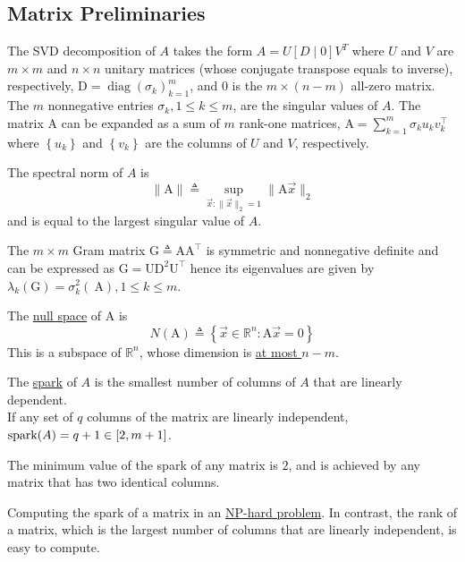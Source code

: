 \documentclass[11pt]{elegantbook}
\begin{document}
\subsection{Matrix Preliminaries}
The SVD decomposition of $A$ takes the form $A=U[D \mid 0] V^T$ where $U$ and $V$ are $m \times m$ and $n \times n$ unitary matrices (whose conjugate transpose equals to inverse), respectively, $\mathrm{D}=\operatorname{diag}\left(\sigma_k\right)_{k=1}^m$, and 0 is the $m \times(n-m)$ all-zero matrix. The $m$ nonnegative entries $\sigma_k, 1 \leq k \leq m$, are the singular values of $A$. The matrix A can be expanded as a sum of $m$ rank-one matrices, $\mathrm{A}=\sum_{k=1}^m \sigma_k u_k v_k^{\top}$ where $\left\{u_k\right\}$ and $\left\{v_k\right\}$ are the columns of $U$ and $V$, respectively.

The spectral norm of $A$ is
$$
\|\mathrm{A}\| \triangleq \sup _{\vec{x}:\|\vec{x}\|_2=1}\|\mathrm{A} \vec{x}\|_2
$$
and is equal to the largest singular value of $A$.

The $m \times m$ Gram matrix $\mathrm{G} \triangleq \mathrm{AA}^{\top}$ is symmetric and nonnegative definite and can be expressed as $\mathrm{G}=\mathrm{UD}^2 \mathrm{U}^{\top}$ hence its eigenvalues are given by $\lambda_k(\mathrm{G})=\sigma_k^2(\mathrm{~A}), 1 \leq k \leq m$.

\begin{definition}
    The \underline{null space} of $\mathrm{A}$ is $$N(\mathrm{A}) \triangleq\left\{\vec{x} \in \mathbb{R}^n: \mathrm{A} \vec{x}=0\right\}$$
    This is a subspace of $\mathbb{R}^n$, whose dimension is \underline{at most $n - m$}.
\end{definition}

\begin{definition}[Spark]
    The \underline{spark} of $A$ is the smallest number of columns of $A$ that are linearly dependent.\\
    If any set of $q$ columns of the matrix are linearly independent, $\textnormal{spark}(A)=q+1\in [2,m+1]$.
\end{definition}
The minimum value of the spark of any matrix is $2$, and is achieved by any matrix that has two identical columns.

Computing the spark of a matrix in an \underline{NP-hard problem}. In contrast, the rank of a matrix, which is the largest number of columns that are linearly independent, is easy to compute.
\end{document}
